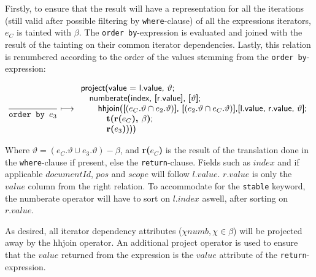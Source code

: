 Firstly, to ensure that the result will have a representation for all the iterations (still valid after possible
filtering by \texttt{where}-clause) of all the expressions iterators, $e_C$ is tainted with $\beta$. The
\texttt{order by}-expression is evaluated and joined with the result of the tainting on their common iterator
dependencies. Lastly, this relation is renumbered according to the order of the values stemming from the
\texttt{order by}-expression:

\begin{equation}
\frac{}{\mbox{\texttt{order by }}e_3}\longmapsto
\begin{array}{l}
\mbox{\textsf{project(value = l.value, }}\vartheta\mbox{\textsf{;}}\\ \quad
\mbox{\textsf{numberate(index, [r.value], [}}\vartheta\mbox{\textsf{];}} \\ \quad \quad
\mbox{\textsf{hhjoin([}}(e_{C}.\vartheta \cap e_2.\vartheta)\mbox{\textsf{], [}}(e_{2}.\vartheta \cap
e_{C}.\vartheta)\mbox{\textsf{],}} 
\mbox{\textsf{[l.value, r.value, }} \vartheta\mbox{\textsf{];}} \\ \quad \quad
\quad \mbox{\textbf{t(r(}}e_C\mbox{\textbf{), }}\beta\mbox{\textbf{)}\textsf{;}} \\ \quad \quad \quad
\mbox{\textbf{r(}}e_3\mbox{\textbf{)}\textsf{)))}}
\end{array}
\label{rule:trans:TD:orderbyOrd}
\end{equation}

Where $\vartheta = (e_C.\vartheta \cup e_3.\vartheta)-\beta$, and \textbf{r(}$e_{C}$\textbf{)} is the result of
the translation done in the \texttt{where}-clause if present, else the
\texttt{return}-clause. Fields such as $index$ and if applicable $documentId$, $pos$ and $scope$ will follow
$l.value$. $r.value$ is only the $value$ column from the right relation. To accommodate for the \texttt{stable}
keyword, the \textsf{numberate} operator will have to sort on $l.index$ aswell, after sorting on $r.value$.

As desired, all iterator dependency attributes ($\chi{numb}, \chi \in \beta$) will be projected away by the
\textsf{hhjoin} operator. An additional \textsf{project} operator is used to ensure that the $value$ returned from
the expression is the $value$ attribute of the \texttt{return}-expression.

